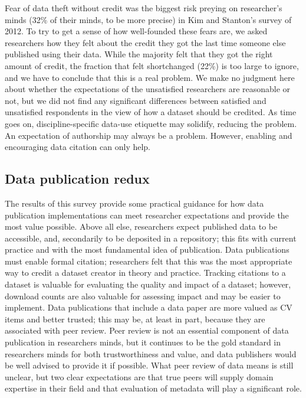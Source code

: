 \documentclass[10pt]{article}
\begin{document}
Fear of data theft without credit was the biggest risk preying on researcher's minds (32\% of their minds, to be more precise) in Kim and Stanton's survey of 2012.\cite{kim_institutional_2012}
To try to get a sense of how well-founded these fears are, we asked researchers how they felt about the credit they got the last time someone else published using their data.
While the majority felt that they got the right amount of credit, the fraction that felt shortchanged (22\%) is too large to ignore, and we have to conclude that this is a real problem.
We make no judgment here about whether the expectations of the unsatisfied researchers are reasonable or not, but we did not find any significant differences between satisfied and unsatisfied respondents in the view of how a dataset should be credited.
As time goes on, discipline-specific data-use etiquette may solidify, reducing the problem.
An expectation of authorship may always be a problem.
However, enabling and encouraging data citation can only help.  

\subsection*{Data publication redux}

The results of this survey provide some practical guidance for how data publication implementations can meet researcher expectations and provide the most value possible.
Above all else, researchers expect published data to be accessible, and, secondarily to be deposited in a repository; this fits with current practice and with the most fundamental idea of publication.
Data publications must enable formal citation; researchers felt that this was the most appropriate way to credit a dataset creator in theory and practice.
Tracking citations to a dataset is valuable for evaluating the quality and impact of a dataset; however, download counts are also valuable for assessing impact and may be easier to implement.
Data publications that include a data paper are more valued as CV items and better trusted; this may be, at least in part, because they are associated with peer review.
Peer review is not an essential component of data publication in researchers minds, but it continues to be the gold standard in researchers minds for both trustworthiness and value, and data publishers would be well advised to provide it if possible.
What peer review of data means is still unclear, but two clear expectations are that true peers will supply domain expertise in their field and that evaluation of metadata will play a significant role.
\end{document}
